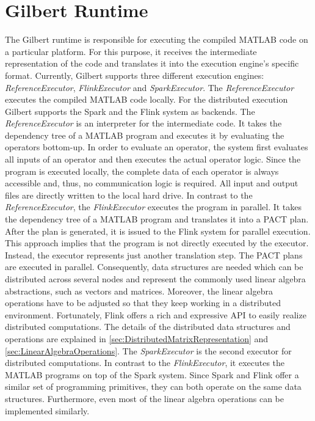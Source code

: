 \section{Gilbert Runtime}
\label{sec:gilbertRuntime}

The Gilbert runtime is responsible for executing the compiled MATLAB code on a particular platform. For this purpose, it receives the intermediate representation of the code and translates it into the execution engine's specific format. Currently, Gilbert supports three different execution engines: \emph{ReferenceExecutor}, \emph{FlinkExecutor} and \emph{SparkExecutor}. The \emph{ReferenceExecutor} executes the compiled MATLAB code locally. For the distributed execution Gilbert supports the Spark and the Flink system as backends. The \emph{ReferenceExecutor} is an interpreter for the intermediate code.
It takes the dependency tree of a MATLAB program and executes it by evaluating the operators bottom-up. In order to evaluate an operator, the system first evaluates all inputs of an operator and then executes the actual operator logic. Since the program is executed locally, the complete data of each operator is always accessible and, thus, no communication logic is required. All input and output files are directly written to the local hard drive. In contrast to the \emph{ReferenceExecutor}, the \emph{FlinkExecutor} executes the program in parallel. It takes the dependency tree of a MATLAB program and translates it into a PACT plan. After the plan is generated, it is issued to the Flink system for parallel execution. This approach implies that the program is not directly executed by the executor. Instead, the executor represents just another translation step. The PACT plans are executed in parallel. Consequently, data structures are needed which can be distributed across several nodes and represent the commonly used linear algebra abstractions, such as vectors and matrices. Moreover, the linear algebra operations have to be adjusted so that they keep working in a distributed environment. Fortunately, Flink offers a rich and expressive API to easily realize distributed computations. The details of the distributed data structures and operations are explained in \cref{sec:DistributedMatrixRepresentation} and \cref{sec:LinearAlgebraOperations}. The \emph{SparkExecutor} is the second executor for distributed computations. In contrast to the \emph{FlinkExecutor}, it executes the MATLAB programs on top of the Spark system. Since Spark and Flink offer a similar set of programming primitives, they can both operate on the same data structures. Furthermore, even most of the linear algebra operations can be implemented similarly.

